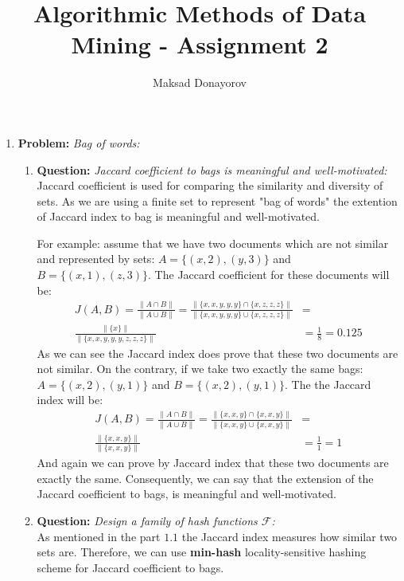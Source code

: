 \documentclass[11pt,a4paper,english]{article}
\title{Algorithmic Methods of Data Mining - Assignment 2}
\author{Maksad Donayorov}
\begin{document}
    \maketitle

    \begin{enumerate}
      \item \textbf{Problem:} \textit{Bag of words:}
        \begin{enumerate}
          \item \textbf{Question:} \textit{Jaccard coefficient to bags is meaningful and well-motivated:}\\
            Jaccard coefficient is used for comparing the similarity and diversity of sets. As we are using a finite set to represent "bag of words" the extention of Jaccard index to bag is meaningful and well-motivated.

            For example: assume that we have two documents which are not similar and represented by sets: $A = \{(x, 2), (y, 3)\}$ and $B = \{(x, 1),(z, 3)\}$. The Jaccard coefficient for these documents will be:
            \begin{align*}
              J(A, B) = \frac{\|A \cap B\|}{\|A \cup B\|} =
              \frac{ \| \{x,x,y,y,y\} \cap \{x,z,z,z\} \| }{ \| \{x,x,y,y,y\} \cup \{x,z,z,z\} \| } & = \\
              \frac{ \| \{x\} \| }{ \| \{ x,x,y,y,y,z,z,z \} \| } & = \frac{1}{8} = 0.125
            \end{align*}
            As we can see the Jaccard index does prove that these two documents are not similar.
            On the contrary, if we take two exactly the same bags: $A = \{(x, 2), (y, 1)\}$ and $B = \{(x, 2),(y, 1)\}$. The the Jaccard index will be:
            \begin{align*}
              J(A, B) = \frac{\|A \cap B\|}{\|A \cup B\|} =
              \frac{ \| \{x,x,y\} \cap \{x,x,y\} \| }{ \| \{x,x,y\} \cup \{x,x,y\} \| } & = \\
              \frac{ \| \{x,x,y\} \| }{ \| \{ x,x,y \} \| } & = \frac{1}{1} = 1
            \end{align*}
            And again we can prove by Jaccard index that these two documents are exactly the same. Consequently, we can say that the extension of the Jaccard coefficient to bags, is
            meaningful and well-motivated.

          \item \textbf{Question:} \textit{Design a family of hash functions $\mathcal{F}$:}\\
            As mentioned in the part $1.1$ the Jaccard index measures how similar two sets are. Therefore, we can use \textbf{min-hash} locality-sensitive hashing scheme for Jaccard coefficient to bags.


\end{enumerate}
\end{enumerate}
\end{document}
